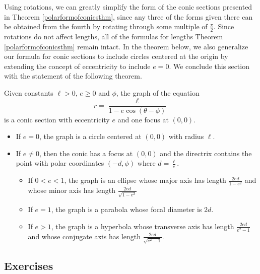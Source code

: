 Using rotations, we can greatly simplify the form of the conic sections presented in Theorem \ref{polarformofconicsthm}, since any three of the forms given there can be obtained from the fourth by rotating through some multiple of $\frac{\pi}{2}$.  Since rotations do not affect lengths, all of the formulas for lengths Theorem \ref{polarformofconicsthm} remain intact. In the theorem below, we also generalize our formula for conic sections to include circles centered at the origin by extending the concept of eccentricity to include $e=0$.  We conclude this section with the statement of the following theorem.

\smallskip
\colorbox{ResultColor}{\bbm
\begin{thm} \label{mostgeneralpolarformconic}  Given constants $\ell > 0$, $e \geq 0$ and $\phi$, the graph of the equation \[ r = \frac{\ell}{1 - e\cos(\theta - \phi)}\] is a conic section with eccentricity $e$ and one focus at $(0,0)$.

\begin{itemize}

\item  If $e = 0$, the graph is a circle centered at $(0,0)$ with radius $\ell$.

\item  If $e \neq 0$, then the conic has a focus at $(0,0)$ and the directrix contains the point with polar coordinates $(-d,\phi)$ where $d = \frac{\ell}{e}$.

\begin{itemize}

\vspace{-.15in}

\item If $0 < e < 1$, the graph is an ellipse whose major axis has length $\frac{2ed}{1-e^2}$ and whose minor axis has length $\frac{2ed}{\sqrt{1-e^2}}$

\item If $e = 1$, the graph is a parabola whose focal diameter is $2d$.

\item If $e > 1$, the graph is a hyperbola whose  transverse axis has length  $\frac{2ed}{e^2-1}$ and whose conjugate axis has length $\frac{2ed}{\sqrt{e^2-1}}$.

\end{itemize} 
\end{itemize} 
\end{thm}
\ebm}

\newpage

\subsection{Exercises}



